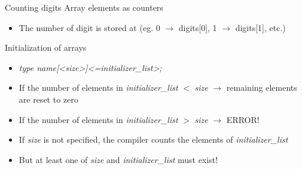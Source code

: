 \documentclass[usenames,dvipsnames,aspectratio=169]{beamer}
\begin{document}
\begin{frame}{Counting digits}
  Array elements as counters
  \begin{itemize}
    \item[] The number of digit  is stored at  (eg. 0 $\to$ digits[0], 1 $\to$ digits[1], etc.)
  \end{itemize}
  \vfill
  Initialization of arrays
  \begin{itemize}
    \item \emph{type name[<size>]<={initializer\_list}>;}
    \item If the number of elements in \emph{initializer\_list} $<$ \emph{size} $\to$ remaining elements are reset to zero
    \item If the number of elements in \emph{initializer\_list} $>$ \emph{size} $\to$ ERROR!
    \item If \emph{size} is not specified, the compiler counts the elements of \emph{initializer\_list}
    \item But at least one of \emph{size} and \emph{initializer\_list} must exist!
  \end{itemize}
\end{frame}
\end{document}
